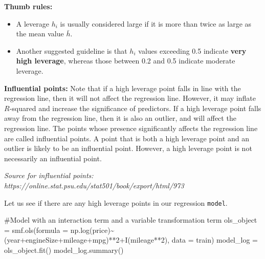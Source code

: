 \documentclass[
  letterpaper,
  DIV=11,
  numbers=noendperiod]{scrreprt}
\newenvironment{Shaded}{\begin{snugshade}}{\end{snugshade}}
\newcommand{\CommentTok}[1]{\textcolor[rgb]{0.37,0.37,0.37}{#1}}
\newcommand{\NormalTok}[1]{\textcolor[rgb]{0.00,0.23,0.31}{#1}}
\newcommand{\OperatorTok}[1]{\textcolor[rgb]{0.37,0.37,0.37}{#1}}
\newcommand{\StringTok}[1]{\textcolor[rgb]{0.13,0.47,0.30}{#1}}
\providecommand{\tightlist}{%
  \setlength{\itemsep}{0pt}\setlength{\parskip}{0pt}}\usepackage{longtable,booktabs,array}
\begin{document}
\textbf{Thumb rules:}

\begin{itemize}
\tightlist
\item
  A leverage \(h_i\) is usually considered large if it is more than
  twice as large as the mean value \(\bar{h}\).
\item
  Another suggested guideline is that \(h_i\) values exceeding 0.5
  indicate \textbf{very high leverage}, whereas those between 0.2 and
  0.5 indicate moderate leverage.
\end{itemize}

\textbf{Influential points:} Note that if a high leverage point falls in
line with the regression line, then it will not affect the regression
line. However, it may inflate \(R\)-squared and increase the
significance of predictors. If a high leverage point falls away from the
regression line, then it is also an outlier, and will affect the
regression line. The points whose presence significantly affects the
regression line are called influential points. A point that is both a
high leverage point and an outlier is likely to be an influential point.
However, a high leverage point is not necessarily an influential point.

\emph{Source for influential points:
https://online.stat.psu.edu/stat501/book/export/html/973}

Let us see if there are any high leverage points in our regression
\texttt{model}.

\begin{Shaded}
\begin{Highlighting}[]
\CommentTok{\#Model with an interaction term and a variable transformation term}
\NormalTok{ols\_object }\OperatorTok{=}\NormalTok{ smf.ols(formula }\OperatorTok{=} \StringTok{\textquotesingle{}np.log(price)\textasciitilde{}(year+engineSize+mileage+mpg)**2+I(mileage**2)\textquotesingle{}}\NormalTok{, data }\OperatorTok{=}\NormalTok{ train)}
\NormalTok{model\_log }\OperatorTok{=}\NormalTok{ ols\_object.fit()}
\NormalTok{model\_log.summary()}
\end{Highlighting}
\end{Shaded}
\end{document}
